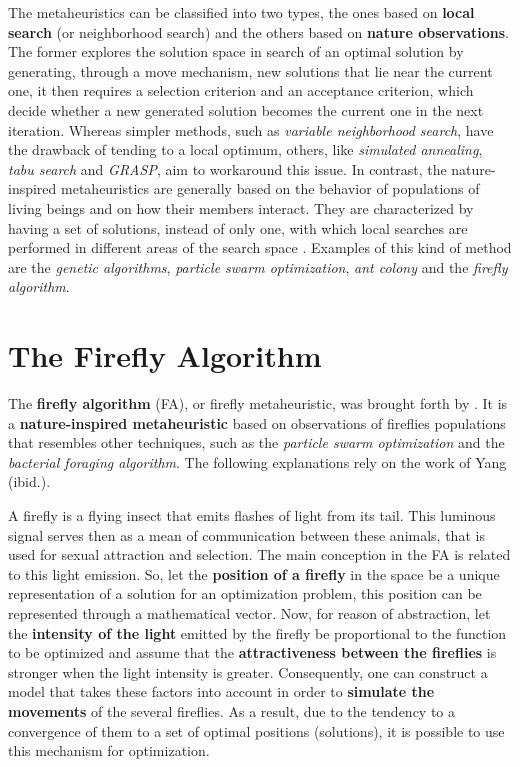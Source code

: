 \documentclass[tuberlin,cic,tc,openright,english,noabntcite,oneside]{iiufrgs}
\begin{document}
The metaheuristics can be classified into two types, the ones based on \textbf{local search} (or neighborhood search) and the others based on \textbf{nature observations}. The former explores the solution space in search of an optimal solution by generating, through a move mechanism, new solutions that lie near the current one, it then requires a selection criterion and an acceptance criterion, which decide whether a new generated solution becomes the current one in the next iteration. Whereas simpler methods, such as \emph{variable neighborhood search}, have the drawback of tending to a local optimum, others, like \emph{simulated annealing}, \emph{tabu search} and \emph{GRASP}, aim to workaround this issue. In contrast, the nature-inspired metaheuristics are generally based on the behavior of populations of living beings and on how their members interact. They are characterized by having a set of solutions, instead of only one, with which local searches are performed in different areas of the search space \parencite[p. 7]{osman_meta-heuristics:_2012}. Examples of this kind of method are the \emph{genetic algorithms}, \emph{particle swarm optimization}, \emph{ant colony} and the \emph{firefly algorithm}.

\section{The Firefly Algorithm}
The \textbf{firefly algorithm} (FA), or firefly metaheuristic, was brought forth by \textcite{yang_firefly_2009}. It is a \textbf{nature-inspired metaheuristic} based on observations of fireflies populations that resembles other techniques, such as the \emph{particle swarm optimization} and the \emph{bacterial foraging algorithm}. The following explanations rely on the work of Yang (ibid.).

A firefly is a flying insect that emits flashes of light from its tail. This luminous signal serves then as a mean of communication between these animals, that is used for sexual attraction and selection. The main conception in the FA is related to this light emission. So, let the \textbf{position of a firefly} in the space be a unique representation of a solution for an optimization problem, this position can be represented through a mathematical vector. Now, for reason of abstraction, let the \textbf{intensity of the light} emitted by the firefly be proportional to the function to be optimized and assume that the \textbf{attractiveness between the fireflies} is stronger when the light intensity is greater. Consequently, one can construct a model that takes these factors into account in order to \textbf{simulate the movements} of the several fireflies. As a result, due to the tendency to a convergence of them to a set of optimal positions (solutions), it is possible to use this mechanism for optimization.
\end{document}
